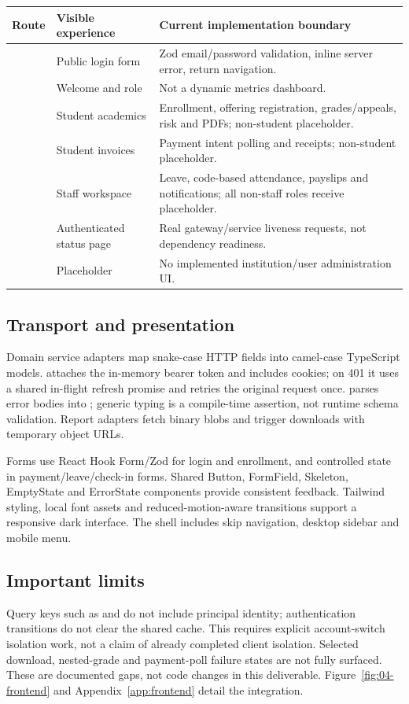 \documentclass[10pt,a4paper]{article}
\begin{document}
\begin{tabularx}{\textwidth}{@{}L{22mm}L{36mm}Y@{}}
\toprule Route & Visible experience & Current implementation boundary\\\midrule
{} & Public login form & Zod email/password validation, inline server error, return navigation.\\
\code{/} & Welcome and role & Not a dynamic metrics dashboard.\\
 & Student academics & Enrollment, offering registration, grades/appeals, risk and PDFs; non-student placeholder.\\
 & Student invoices & Payment intent polling and receipts; non-student placeholder.\\
 & Staff workspace & Leave, code-based attendance, payslips and notifications; all non-staff roles receive placeholder.\\
 & Authenticated status page & Real gateway/service liveness requests, not dependency readiness.\\
 & Placeholder & No implemented institution/user administration UI.\\
\bottomrule
\end{tabularx}
\subsection{Transport and presentation}
Domain service adapters map snake-case HTTP fields into camel-case TypeScript
models.  attaches the in-memory bearer token and includes cookies;
on 401 it uses a shared in-flight refresh promise and retries the original request
once.  parses error bodies into ; generic typing
is a compile-time assertion, not runtime schema validation.
Report adapters fetch binary blobs and trigger downloads with temporary object URLs.

Forms use React Hook Form/Zod for login and enrollment, and controlled state in
payment/leave/check-in forms. Shared Button, FormField, Skeleton, EmptyState and
ErrorState components provide consistent feedback. Tailwind styling, local font
assets and reduced-motion-aware transitions support a responsive dark interface.
The shell includes skip navigation, desktop sidebar and mobile menu.

\subsection{Important limits}
Query keys such as  and  do not include principal
identity; authentication transitions do not clear the shared cache. This requires
explicit account-switch isolation work, not a claim of already completed client
isolation. Selected download, nested-grade and payment-poll failure states are not
fully surfaced. These are documented gaps, not code changes in this deliverable.
Figure~\ref{fig:04-frontend} and Appendix~\ref{app:frontend} detail the integration.
\end{document}
